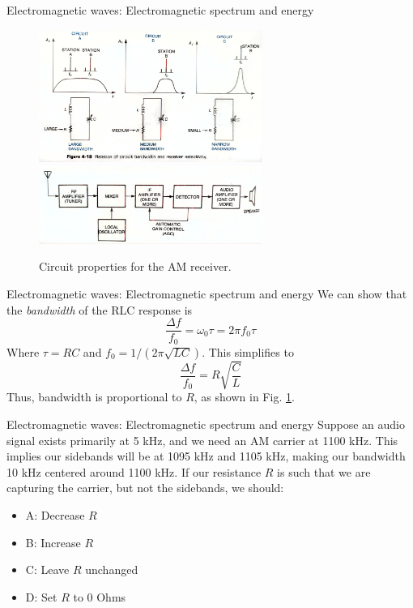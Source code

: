 \documentclass{beamer}
\begin{document}
\begin{frame}{Electromagnetic waves: Electromagnetic spectrum and energy}
\begin{figure}
\centering
\includegraphics[width=0.65\textwidth]{figures/RX.pdf}
\includegraphics[width=0.65\textwidth]{figures/SuperHet.pdf}
\caption{\label{fig:rx} \footnotesize Circuit properties for the AM receiver.}
\end{figure}
\end{frame}

\begin{frame}{Electromagnetic waves: Electromagnetic spectrum and energy}
We can show that the \textit{bandwidth} of the RLC response is
\begin{equation}
\frac{\Delta f}{f_0} = \omega_0 \tau = 2\pi f_0 \tau
\end{equation}
Where $\tau = RC$ and $f_0 = 1/(2\pi \sqrt{LC})$.  This simplifies to
\begin{equation}
\frac{\Delta f}{f_0} = R \sqrt{\frac{C}{L}}
\end{equation}
Thus, bandwidth is proportional to $R$, as shown in Fig. \ref{fig:rx}.
\end{frame}

\begin{frame}{Electromagnetic waves: Electromagnetic spectrum and energy}
Suppose an audio signal exists primarily at 5 kHz, and we need an AM carrier at 1100 kHz.  This implies our sidebands will be at 1095 kHz and 1105 kHz, making our bandwidth 10 kHz centered around 1100 kHz.  If our resistance $R$ is such that we are capturing the carrier, but not the sidebands, we should:
\begin{itemize}
\item A: Decrease $R$
\item B: Increase $R$
\item C: Leave $R$ unchanged 
\item D: Set $R$ to 0 Ohms
\end{itemize}
\end{frame}
\end{document}
